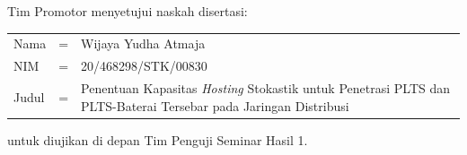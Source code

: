 {}
\vspace*{8pt}

\BgThispage

\noindent Tim Promotor menyetujui naskah disertasi:
\vspace*{-8pt}
{
\begin{longtable}{llp{340pt}}
	\hspace*{-6pt}Nama						& = & Wijaya Yudha Atmaja\\
	\hspace*{-6pt}NIM							& = & 20/468298/STK/00830\\
	\hspace*{-6pt}Judul	& = & Penentuan Kapasitas \textit{Hosting} Stokastik untuk Penetrasi PLTS dan PLTS-Baterai Tersebar pada Jaringan Distribusi
\end{longtable}
}
\vspace*{-22pt}
\noindent untuk diujikan di depan Tim Penguji Seminar Hasil 1.
\vspace*{5cm}

